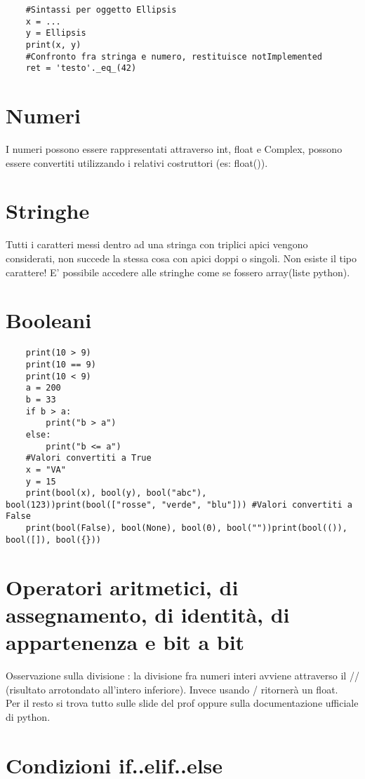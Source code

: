 \begin{lstlisting}
	#Sintassi per oggetto Ellipsis
	x = ...
	y = Ellipsis
	print(x, y)
	#Confronto fra stringa e numero, restituisce notImplemented
	ret = 'testo'._eq_(42)
\end{lstlisting}

\section{Numeri}

I numeri possono essere rappresentati attraverso int, float e Complex, possono essere convertiti utilizzando i relativi costruttori (es: float()).

\section{Stringhe}

Tutti i caratteri messi dentro ad una stringa con triplici apici vengono considerati, non succede la stessa cosa con apici doppi o singoli.
Non esiste il tipo carattere! E' possibile accedere alle stringhe come se fossero array(liste python).

\section{Booleani}
\begin{lstlisting}
	print(10 > 9)
	print(10 == 9)
	print(10 < 9)
	a = 200
	b = 33
	if b > a:
		print("b > a")
	else:
		print("b <= a")
	#Valori convertiti a True
	x = "VA"
	y = 15
	print(bool(x), bool(y), bool("abc"), bool(123))print(bool(["rosse", "verde", "blu"])) #Valori convertiti a False
	print(bool(False), bool(None), bool(0), bool(""))print(bool(()), bool([]), bool({}))
\end{lstlisting}

\section{Operatori aritmetici, di assegnamento, di identità, di appartenenza e bit a bit}

Osservazione sulla divisione : la divisione fra numeri interi avviene attraverso il // (risultato arrotondato all'intero inferiore). Invece usando / ritornerà un float.\\
Per il resto si trova tutto sulle slide del prof oppure sulla documentazione ufficiale di python.

\section{Condizioni if..elif..else}

